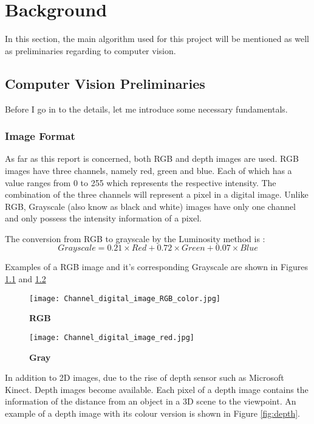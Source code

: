 \chapter{Background}
\label{sec:background}
In this section, the main algorithm used for this project will be mentioned as well as preliminaries regarding to computer vision.
\section{Computer Vision Preliminaries}
\label{sec:cvpre}
Before I go in to the details, let me introduce some necessary fundamentals.
\subsection{Image Format}
\label{sec:imageformat}
As far as this report is concerned, both RGB and depth images are used. RGB images have three channels, namely red, green and blue. Each of which has a value ranges from 0 to 255 which represents the respective intensity. The combination of the three channels will represent a pixel in a digital image. Unlike RGB, Grayscale (also know as black and white) images have only one channel and only possess the intensity information of a pixel. \cite{gray} 

The conversion from RGB to grayscale by the Luminosity method is :
\begin{equation}
 Grayscale = 0.21\times Red + 0.72\times Green + 0.07\times Blue
\end{equation}

Examples of a RGB image and it's corresponding Grayscale are shown in Figures \ref{fig:rgb} and \ref{fig:gray}

\begin{figure}
	\centering
	\texttt{[image: Channel\_digital\_image\_RGB\_color.jpg]}
	\caption[rgb image]{\label{fig:rgb}}  \textbf{RGB} 
\end{figure}

\begin{figure}
	\centering
	\texttt{[image: Channel\_digital\_image\_red.jpg]}
	\caption[gray image]{\label{fig:gray}}  \textbf{Gray} 
\end{figure}

In addition to 2D images, due to the rise of depth sensor such as Microsoft Kinect. Depth images become available. Each pixel of a depth image contains the information of the distance from an object in a 3D scene to the viewpoint. An example of a depth image with its colour version is shown in Figure \ref{fig:depth}.

